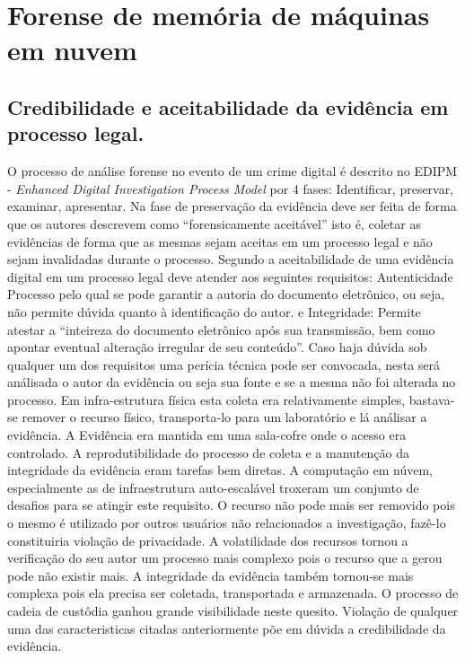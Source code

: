 \chapter{Forense de memória de máquinas em nuvem}

\section{Credibilidade e aceitabilidade da evidência em processo legal.}
\label{sec:credibilidadeaceitabilidadeevidencia}

O processo de análise forense no evento de um crime digital é descrito no EDIPM - \textit{Enhanced Digital Investigation Process Model} por 4 fases: Identificar, preservar, examinar, apresentar. \cite{GrisposChallengesCloudComputing:2012}
%
Na fase de preservação da evidência deve ser feita de forma que os autores descrevem como ``forensicamente aceitável'' isto é, coletar as evidências de forma que as mesmas sejam aceitas em um processo legal e não sejam invalidadas durante o processo.
%
Segundo \cite{Ramos:2011} a aceitabilidade de uma evidência digital em um processo legal deve atender aos seguintes requisitos: Autenticidade Processo pelo qual se pode garantir a autoria do documento eletrônico, ou seja, não permite dúvida quanto à identificação do autor.
%
e Integridade: Permite atestar a “inteireza do documento eletrônico após sua transmissão, bem como apontar eventual alteração irregular de seu conteúdo”.
%
Caso haja dúvida sob qualquer um dos requisitos uma perícia técnica pode ser convocada, nesta será análisada o autor da evidência ou seja sua fonte e se a mesma não foi alterada no processo.
%
Em infra-estrutura física esta coleta era relativamente simples, bastava-se remover o recurso físico, transporta-lo para um laboratório e lá análisar a evidência. A Evidência era mantida em uma sala-cofre onde o acesso era controlado.
%
A reprodutibilidade do processo de coleta e a manutenção da integridade da evidência eram tarefas bem diretas.
%
A computação em núvem, especialmente as de infraestrutura auto-escalável troxeram um conjunto de desafios para se atingir este requisito. O recurso não pode mais ser removido pois o mesmo é utilizado por outros usuários não relacionados a investigação, fazê-lo constituiria violação de privacidade.
%
A volatilidade dos recursos tornou a verificação do seu autor um processo mais complexo pois o recurso que a gerou pode não existir mais.
%
A integridade da evidência também tornou-se mais complexa pois ela precisa ser coletada, transportada e armazenada. O processo de cadeia de custôdia ganhou grande visibilidade neste quesito.
%
Violação de qualquer uma das caracteristicas citadas anteriormente põe em dúvida a credibilidade da evidência.



